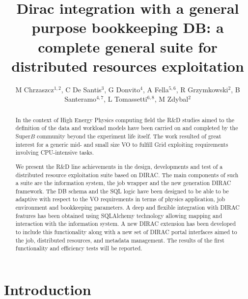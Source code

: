 \documentclass[a4paper]{jpconf}
\begin{document}
\title{Dirac integration with a general purpose bookkeeping DB: a complete general suite for distributed resources exploitation}

\author{M Chrzaszcz$^{1,2}$, C De Santis$^3$, G Donvito$^4$, A Fella$^{5,6}$, R Grzymkowski$^2$, B Santeramo$^{4,7}$, L Tomassetti$^{6,8}$, M Zdybal$^2$}
\address{$^1$ Physik-Institut, Universitat Zurich, Zurich, Switzerland}
\address{$^2$ Henryk Niewodniczanski Institute of Nuclear Physics Polish Academy of Sciences, Krakow, Poland}
\address{$^3$ INFN - Sezione di Roma Tor Vergata, Roma, Italy}
\address{$^4$ INFN - Sezione di Bari, Bari, Italy}
\address{$^5$ INFN - Sezione di Pisa, Pisa, Italy}
\address{$^6$ Dipartimento di Matematica e Informatica, Universit\'a di Ferrara, Ferrara, Italy}
\address{$^7$ Dipartimento Interateneo di Fisica dell’Universit\'a e del Politecnico di Bari, Bari, Italy}
\address{$^8$ INFN - Sezione di Ferrara, Ferrara, Italy}

\begin{abstract}
In the context of High Energy Physics computing field the R\&D studies aimed to
the definition of the data and workload models have been carried on and 
completed by the Super$B$ community beyond the experiment life itself.
The work resulted of great interest for a generic mid- and small size VO to 
fulfill Grid exploiting requirements involving CPU-intensive tasks.

We present the R\&D line achievements in the design, developments and test of a
distributed resource exploitation suite based on DIRAC. The main components of
such a suite are the information system, the job wrapper and the new generation
DIRAC framework. The DB schema and the SQL logic have been designed to be able
to be adaptive with respect to the VO requirements in terms of physics 
application, job environment and bookkeeping parameters. A deep and flexible 
integration with DIRAC features has been obtained using SQLAlchemy technology
allowing mapping and interaction with the information system. A new DIRAC
extension has been developed to include this functionality along with a new set
of DIRAC portal interfaces aimed to the job, distributed resources, and
metadata management. The results of the first functionality and efficiency
tests will be reported.
\end{abstract}

\section{Introduction}
\end{document}

